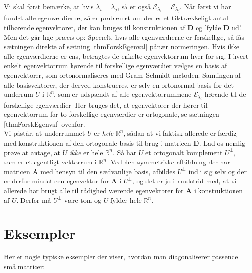 \begin{bevis}
Vi skal først bemærke, at hvis $\lambda_{i} = \lambda_{j}$, så er også $\mathcal{E}_{\lambda_{i}} = \mathcal{E}_{\lambda_{j}}$. Når først vi har fundet alle egenværdierne, så er problemet om der er et tilstrækkeligt antal tilhørende egenvektorer, der kan bruges til konstruktionen af $\mathbf{D}$ og 'fylde $\mathbf{D}$ ud'. Men det går lige præcis op:
Specielt, hvis alle egenværdierne er forskellige, så fås sætningen direkte af sætning \ref{thmForskEgenval} pånær normeringen. Hvis ikke alle egenværdierne er ens, betragtes de enkelte egenvektorrum hver for sig. I hvert enkelt egenvektorrum hørende til forskellige egenværdier vælges en basis af egenvektorer, som ortonormaliseres med Gram--Schmidt metoden. Samlingen af alle basisvektorer, der derved konstrueres, er selv en ortonormal basis for det underrum $U$ i $\mathbb{R}^{n}$, som er udspændt af alle egenvektorrummene
$\mathcal{E}_{\lambda_{i}}$ hørende til de forskellige egenværdier. Her bruges det, at egenvektorer der hører til  egenvektorrum for to forskellige egenværdier er
ortogonale, se sætningen \ref{thmForskEgenval} ovenfor. \\

Vi påstår, at underrummet $U$  er {\textit{hele}} $\mathbb{R}^{n}$, sådan at vi faktisk allerede er færdig med konstruktionen af den ortogonale basis til brug i matricen $\mathbf{D}$. Lad os nemlig prøve at antage, at $U$ {\textit{ikke}} er hele $\mathbb{R}^{n}$. Så har $U$ et ortogonalt komplement $U^{\bot}$, som er et egentligt vektorrum i $\mathbb{R}^{n}$. Ved den symmetriske afbildning der har matricen $\mathbf{A}$ med hensyn til den sædvanlige basis, afbildes $U^{\bot}$ ind i sig selv og der er derfor mindst een egenvektor for $\mathbf{A}$ i $U^{\bot}$, og det er jo i modstrid med, at vi allerede har brugt alle til rådighed værende
egenvektorer for $\mathbf{A}$  i konstruktionen af $U$. Derfor må $U^{\bot}$ være tom og $U$ fylder hele $\mathbb{R}^{n}$.
\end{bevis}


\section{Eksempler}

Her er nogle typiske eksempler der viser, hvordan man diagonaliserer passende små matricer:

